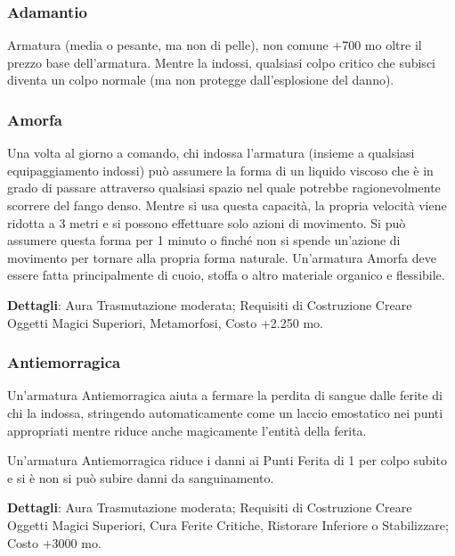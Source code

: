 \begin{multicols}{2}
	\subsubsection*{Adamantio}

	Armatura (media o pesante, ma non di pelle), non comune +700 mo oltre il prezzo base dell'armatura. Mentre la indossi, qualsiasi colpo critico che subisci diventa un colpo normale (ma non protegge dall'esplosione del danno).


	\subsubsection*{Amorfa}

	Una volta al giorno a comando, chi indossa l'armatura (insieme a qualsiasi equipaggiamento indossi) può assumere la forma di un liquido viscoso che è in grado di passare attraverso qualsiasi spazio nel quale potrebbe ragionevolmente scorrere del fango denso. Mentre si usa questa capacità, la propria velocità viene ridotta a 3 metri e si possono effettuare solo azioni di movimento. Si può assumere questa forma per 1 minuto o finché non si spende un'azione di movimento per tornare alla propria forma naturale. Un'armatura Amorfa deve essere fatta principalmente di cuoio, stoffa o altro materiale organico e flessibile.

	\textbf{Dettagli}: Aura Trasmutazione moderata; Requisiti di Costruzione Creare Oggetti Magici Superiori, Metamorfosi, Costo +2.250 mo.


	\subsubsection*{Antiemorragica}

	Un'armatura Antiemorragica aiuta a fermare la perdita di sangue dalle ferite di chi la indossa, stringendo automaticamente come un laccio emostatico nei punti appropriati mentre riduce anche magicamente l'entità della ferita.

	Un'armatura Antiemorragica riduce i danni ai Punti Ferita di 1 per colpo subito e si è non si può subire danni da sanguinamento.

	\textbf{Dettagli}: Aura Trasmutazione moderata; Requisiti di Costruzione Creare Oggetti Magici Superiori, Cura Ferite Critiche, Ristorare Inferiore o Stabilizzare; Costo +3000 mo.


\end{multicols}
